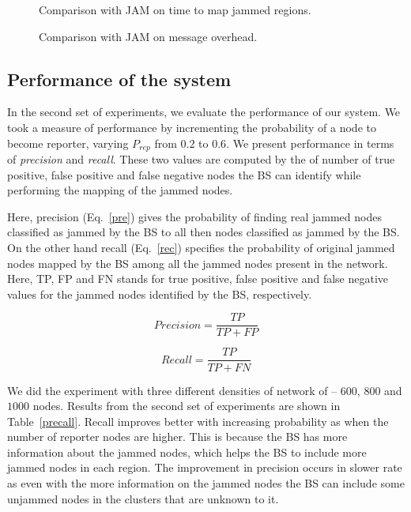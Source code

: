 \documentclass[conference]{IEEEtran}
\begin{document}
\begin{figure}
  \begin{center}
  \end{center}
  \caption{Comparison with JAM on time to map jammed regions.}
  \label{fig:comp_time}
\end{figure}

\begin{figure}
  \begin{center}
  \end{center}
  \caption{Comparison with JAM on message overhead.}
  \label{fig:comp_msg}
\end{figure}



\subsection{Performance of the system}

In the second set of experiments, we evaluate the performance of our system. We took a measure of performance by incrementing the probability of a node to become reporter, varying $P_{rep}$ from $0.2$ to $0.6$. We present performance in terms of \emph{precision} and \emph{recall}. These two values are computed by the of number of true positive, false positive and false negative nodes the BS can identify while performing the mapping of the jammed nodes. 

Here, precision (Eq.~\ref{pre}) gives the probability of finding real jammed nodes classified as jammed by the BS to all then nodes classified as jammed by the BS. On the other hand recall (Eq.~\ref{rec}) specifies the probability of original jammed nodes mapped by the BS among all the jammed nodes present in the network. Here, TP, FP and FN stands for true positive, false positive and false negative values for the jammed nodes identified by the BS, respectively.

\begin{equation}
 Precision =\frac{TP}{TP+FP} 
\label{pre}
\end{equation} 

\begin{equation}
Recall =\frac{TP}{TP+FN}
\label{rec}
\end{equation} 

We did the experiment with three different densities of network of -- $600$, $800$ and $1000$ nodes. Results from the second set of experiments are shown in Table~\ref{precall}. Recall improves better with increasing probability as when the number of reporter nodes are higher. This is because the BS has more information about the jammed nodes, which helps the BS to include more jammed nodes in each region. The improvement in precision occurs in slower rate as even with the more information on the jammed nodes the BS can include some unjammed nodes in the clusters that are unknown to it.
\end{document}
